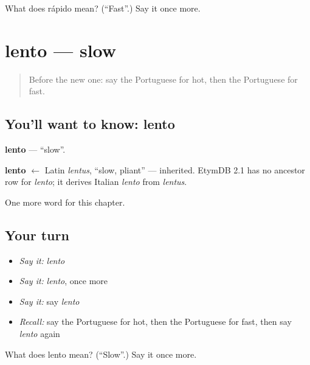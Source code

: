 \begin{tcolorbox}[breakable,colback=teal!4,colframe=teal!35!black,title={Before you move on}]
What does rápido mean? (\textquotedblleft{}Fast\textquotedblright{}.) Say it once more.
\end{tcolorbox}
\section[lento]{lento — slow}

\label{lesson:PT-C66-lento}



\begin{quote}
Before the new one: say the Portuguese for hot, then the Portuguese for fast.
\end{quote}

\subsection*{You'll want to know: lento}
\textbf{lento} — \textquotedblleft{}slow\textquotedblright{}.

\begin{cousinweb}
\textbf{lento} $\leftarrow$ Latin \emph{lentus}, \textquotedblleft{}slow, pliant\textquotedblright{} — inherited. EtymDB 2.1 has no ancestor row for \emph{lento}; it derives Italian \emph{lento} from \emph{lentus}.
\end{cousinweb}

\begin{grammarlens}[title={What you've built}]
One more word for this chapter.
\end{grammarlens}

\subsection*{Your turn}
\begin{itemize}
\raggedright
  \item \emph{Say it:} \emph{lento}
  \item \emph{Say it:} \emph{lento}, once more
  \item \emph{Say it:} say \emph{lento}
  \item \emph{Recall:} say the Portuguese for hot, then the Portuguese for fast, then say \emph{lento} again
\end{itemize}

\begin{tcolorbox}[breakable,colback=teal!4,colframe=teal!35!black,title={Before you move on}]
What does lento mean? (\textquotedblleft{}Slow\textquotedblright{}.) Say it once more.
\end{tcolorbox}
